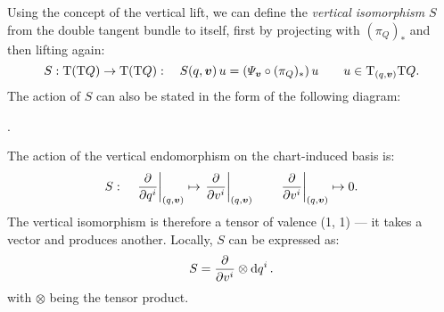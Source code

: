 Using the concept of the vertical lift, we can define the \emph{vertical isomorphism} \(S\) from the double tangent bundle to itself, first by projecting with \((\pi_Q)_*\) and then lifting again:
\begin{equation}
     S: \tbundle{\qty(\tbundle{Q})} \to \tbundle{\qty(\tbundle{Q})}: \quad S(q, \vec{v})\,u = \qty(\Psi_{\vec{v}} \circ (\pi_Q)_*)\,u \qquad u \in \tspace{(q, \vec{v})}{\tbundle{Q}}.
\end{equation}
The action of \(S\) can also be stated in the form of the following diagram:
\begin{center}
   .
\end{center}
The action of the vertical endomorphism on the chart-induced basis is:
\begin{equation}
     S: \quad \left. \pdv{}{q^i}\right|_{(q, \vec{v})} \mapsto \left.\pdv{}{v^i}\right|_{(q, \vec{v})} \qquad  \left. \pdv{}{v^i}\right|_{(q, \vec{v})} \mapsto 0.
\end{equation}
The vertical isomorphism is therefore a tensor of valence (1, 1) --- it takes a vector and produces another. Locally, \(S\) can be expressed as:
\begin{equation}
     S = \pdv{}{v^i}\otimes \dd{q^i}.
\end{equation}
with \(\otimes\) being the tensor product. \cite{Carinena1990}

